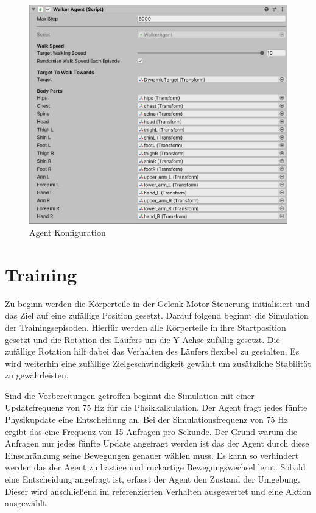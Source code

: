 \begin{figure}[H]
  \centering  
  \includegraphics[scale=0.5]{img/agent_konfiguration.png}
  \caption{Agent Konfiguration}
  \label{fig:agent_konfiguration}
\end{figure}

\section{Training}

Zu beginn werden die Körperteile in der Gelenk Motor Steuerung initialisiert und das Ziel auf eine zufällige Position gesetzt.
Darauf folgend beginnt die Simulation der Trainingsepisoden. Hierfür werden alle Körperteile in ihre Startposition gesetzt und die Rotation des Läufers um die Y Achse zufällig gesetzt. Die zufällige Rotation hilf dabei das Verhalten des Läufers flexibel zu gestalten. Es wird weiterhin eine zufällige Zielgeschwindigkeit gewählt um zusätzliche Stabilität zu gewährleisten.

Sind die Vorbereitungen getroffen beginnt die Simulation mit einer Updatefrequenz von 75 Hz für die Phsikkalkulation. Der Agent fragt jedes fünfte Physikupdate eine Entscheidung an. Bei der Simulationsfrequenz von 75 Hz ergibt das eine Frequenz von 15 Anfragen pro Sekunde. Der Grund warum die Anfragen nur jedes fünfte Update angefragt werden ist das der Agent durch diese Einschränkung seine Bewegungen genauer wählen muss. Es kann so verhindert werden das der Agent zu hastige und ruckartige Bewegungswechsel lernt. Sobald eine Entscheidung angefragt ist, erfasst der Agent den Zustand der Umgebung. Dieser wird anschließend im referenzierten Verhalten ausgewertet und eine Aktion ausgewählt.

